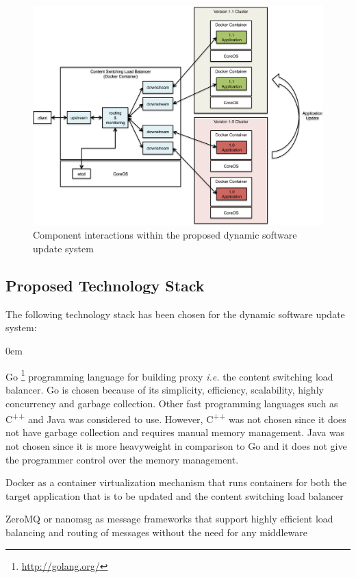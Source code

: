 \documentclass[a4paper,11pt,twoside]{article}
\begin{document}
\begin{figure}[!ht]
  \centering
     \includegraphics[scale=0.62]{proposed_solution}
  \caption{Component interactions within the proposed  dynamic software update system}
  \label{proposed_solution}
\end{figure}


\subsection{Proposed Technology Stack} 
The following technology stack has been chosen for the dynamic software update system:

\begin{list}{-}{}
  \itemsep0em
  \item Go \footnote{\url{http://golang.org/}} programming language for building proxy \textit{i.e.} the content switching load balancer. Go is chosen because of its simplicity, efficiency, scalability, highly concurrency and garbage collection. Other fast programming languages such as C\textsuperscript{++} and Java was considered to use. However, C\textsuperscript{++} was not chosen since it does not have garbage collection and requires manual memory management. Java was not chosen since it is more heavyweight in comparison to Go and it does not give the programmer control over the memory management.  
    
  \item Docker as a container virtualization mechanism that runs containers for both the target application that is to be updated and the content switching load balancer
  
  \item ZeroMQ or nanomsg as message frameworks that support highly efficient load balancing and routing of messages without the need for any middleware  

    \end{list}
\end{document}
